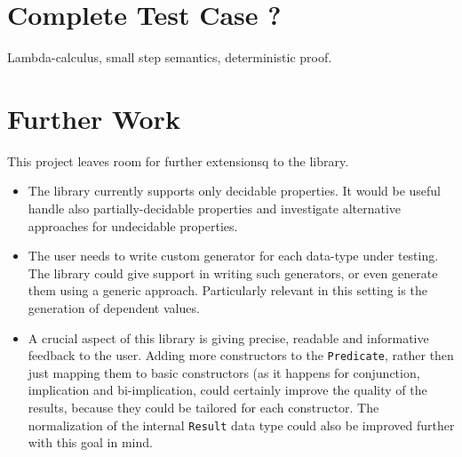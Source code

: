 \documentclass[10pt,a4paper]{article}
\begin{document}
\section{Complete Test Case ?}
Lambda-calculus, small step semantics, deterministic proof.

\section{Further Work}
This project leaves room for further extensionsq to the library.
\begin{itemize}
	\item The library currently supports only decidable properties. It would be useful handle also partially-decidable properties and investigate alternative approaches for undecidable properties.
	\item The user needs to write custom generator for each data-type under testing. The library could give support in writing such generators, or even generate them using a generic approach. Particularly relevant in this setting is the generation of dependent values.
	\item A crucial aspect of this library is giving precise, readable and informative feedback to the user. Adding more constructors to the \texttt{Predicate}, rather then just mapping them to basic constructors (as it happens for conjunction, implication and bi-implication, could certainly improve the quality of the results, because they could be tailored for each constructor. The normalization of the internal \texttt{Result} data type could also be improved further with this goal in mind.
\end{itemize}
\end{document}
